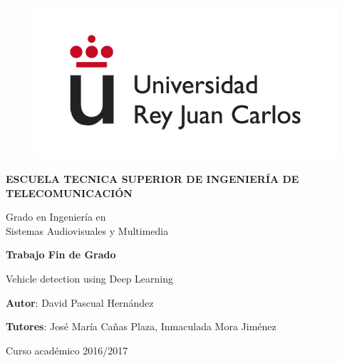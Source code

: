\begin{titlepage}
	
	\begin{center}
		
		\begin{figure}[htb]
			\begin{center}
				\includegraphics[width=0.6\linewidth]{figures/logo}
			\end{center}
		\end{figure}
		
		\vspace{10mm}
		
		\begin{Large}
			\textbf{ESCUELA TECNICA SUPERIOR DE INGENIERÍA DE TELECOMUNICACIÓN}
			\vspace{10mm}
		\end{Large}
		
		\begin{Large}
			Grado en Ingeniería en\\ \vspace{2mm} Sistemas Audiovisuales y Multimedia
		\end{Large}
		
		\vspace{10mm}
		
		\begin{large}
			\textbf{Trabajo Fin de Grado}
		\end{large}
		\vspace{25mm}
		
		\begin{huge}
			Vehicle detection using Deep Learning
		\end{huge}
		
		\vspace{25mm}
		
		\begin{large}
			\textbf{Autor}: David Pascual Hernández
			
			\textbf{Tutores}: José María Cañas Plaza, Inmaculada Mora Jiménez 
			
			\vspace{10mm}
			
			Curso académico 2016/2017
		\end{large}
		
		\vspace{10mm}
		
	\end{center}
	
\end{titlepage}

